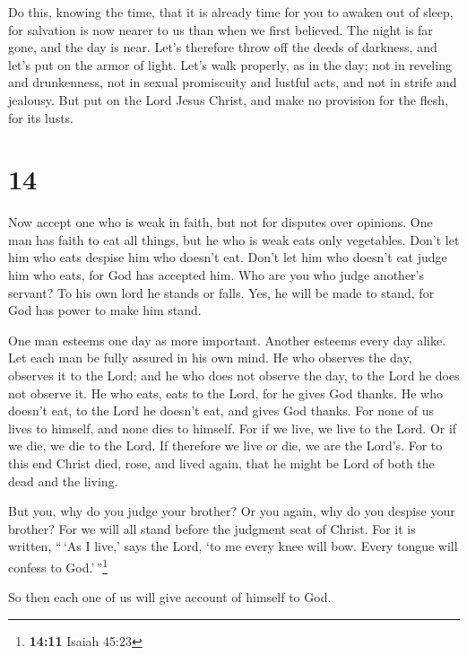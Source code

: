  Do this, knowing the time, that it is already time for
you to awaken out of sleep, for salvation is now nearer to us than when
we first believed.  The night is far gone, and the day is
near. Let's therefore throw off the deeds of darkness, and let's put on
the armor of light.  Let's walk properly, as in the day;
not in reveling and drunkenness, not in sexual promiscuity and lustful
acts, and not in strife and jealousy.  But put on the
Lord Jesus Christ, and make no provision for the flesh, for its lusts.

\hypertarget{section-13}{%
\section{14}\label{section-13}}

 Now accept one who is weak in faith, but not for disputes
over opinions.  One man has faith to eat all things, but
he who is weak eats only vegetables.  Don't let him who
eats despise him who doesn't eat. Don't let him who doesn't eat judge
him who eats, for God has accepted him.  Who are you who
judge another's servant? To his own lord he stands or falls. Yes, he
will be made to stand, for God has power to make him stand.

 One man esteems one day as more important. Another
esteems every day alike. Let each man be fully assured in his own mind.
 He who observes the day, observes it to the Lord; and he
who does not observe the day, to the Lord he does not observe it. He who
eats, eats to the Lord, for he gives God thanks. He who doesn't eat, to
the Lord he doesn't eat, and gives God thanks.  For none
of us lives to himself, and none dies to himself.  For if
we live, we live to the Lord. Or if we die, we die to the Lord. If
therefore we live or die, we are the Lord's.  For to this
end Christ died, rose, and lived again, that he might be Lord of both
the dead and the living.

 But you, why do you judge your brother? Or you again,
why do you despise your brother? For we will all stand before the
judgment seat of Christ.  For it is written, ``\,`As I
live,' says the Lord, `to me every knee will bow. Every tongue will
confess to God.'\,''\footnote{\textbf{14:11} Isaiah 45:23}

 So then each one of us will give account of himself to
God.

